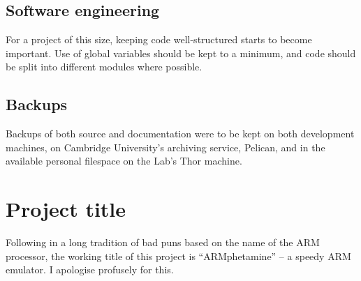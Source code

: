 \subsection{Software engineering}

For a project of this size, keeping code well-structured starts to become important. Use of global variables should be kept to a minimum, and code should be split into different modules where possible.

\subsection{Backups}

Backups of both source and documentation were to be kept on both development machines, on Cambridge University's archiving service, Pelican, and in the available personal filespace on the Lab's Thor machine.

\section{Project title}

Following in a long tradition of bad puns based on the name of the ARM processor, the working title of this project is ``ARMphetamine'' -- a speedy ARM emulator. I apologise profusely for this.
